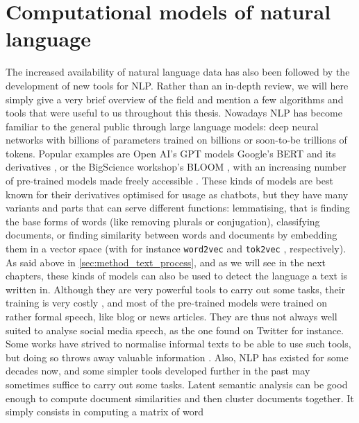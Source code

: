 \documentclass[../thesis.tex]{subfiles}
\begin{document}
\section{Computational models of natural language}
The increased availability of natural language data has also been followed by the
development of new tools for \ac{NLP}. Rather than an in-depth review, we will here
simply give a very brief overview of the field and mention a few algorithms and tools
that were useful to us throughout this thesis. Nowadays \ac{NLP} has become familiar to
the general public through large language models: deep neural networks with billions of
parameters trained on billions or soon-to-be trillions of tokens. Popular examples are
Open AI's GPT models \cite{BrownLanguageModels2020} Google's BERT
\cite{DevlinBERTPretraining2019} and its derivatives \cite{SanhDistilBERTDistilled2020},
or the BigScience workshop's BLOOM \cite{WorkshopBLOOM176BParameter2022}, with an
increasing number of pre-trained models made freely accessible
\cite{WolfTransformersStateoftheArt2020,MontaniExplosionSpaCy2023}. These kinds of
models are best known for their derivatives optimised for usage as chatbots, but they
have many variants and parts that can serve different functions: lemmatising, that is
finding the base forms of words (like removing plurals or conjugation), classifying
documents, or finding similarity between words and documents by embedding them in a
vector space (with for instance \texttt{word2vec} \cite{MikolovEfficientEstimation2013}
and \texttt{tok2vec} \cite{AngelovTop2VecDistributed2020}, respectively). As said above
in \cref{sec:method_text_process}, and as we will see in the next chapters, these kinds
of models can also be used to detect the language a text is written in. Although they
are very powerful tools to carry out some tasks, their training is very costly
\cite{AnanthaswamyAIBigger2023}, and most of the pre-trained models were trained on
rather formal speech, like blog or news articles. They are thus not always well suited
to analyse social media speech, as the one found on Twitter for instance. Some works
have strived to normalise informal texts to be able to use such tools, but doing so
throws away valuable information \cite{EisensteinWhatBad2013}. Also, \ac{NLP} has
existed for some decades now, and some simpler tools developed further in the past may
sometimes suffice to carry out some tasks. Latent semantic analysis
\cite{DumaisLatentSemantic2004} can be good enough to compute document similarities and
then cluster documents together. It simply consists in computing a matrix of word
\end{document}
